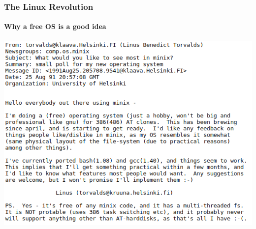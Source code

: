 \documentclass[unknownkeysallowed, 10pt, a4 paper, handout]{beamer}
\begin{document}
\begin{frame}[label=os]
  \frametitle{The Linux Revolution}
  \framesubtitle{Why a free OS is a good idea}
  \begin{center}
    \includegraphics[scale=0.5]{pics/linux-first-announcement-email.png}
  \end{center}
\end{frame}
\end{document}
